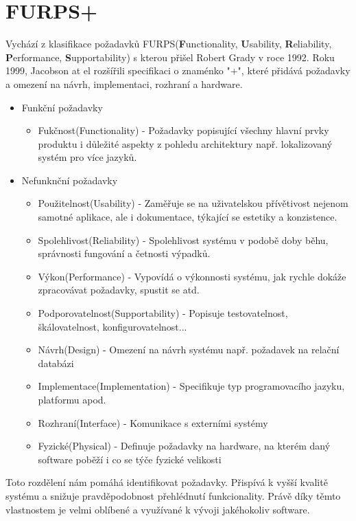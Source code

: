 \section{FURPS+}
	Vychází z klasifikace požadavků FURPS(\textbf{F}unctionality, \textbf{U}sability, \textbf{R}eliability, \textbf{P}erformance, \textbf{S}upportability) s kterou přišel Robert Grady v roce 1992. Roku 1999, Jacobson at el rozšířili specifikaci o znaménko "+", které přidává požadavky a omezení na návrh, implementaci, rozhraní a hardware\cite{furps}. 
	
	\begin{itemize}
		\item Funkční požadavky
			\begin{itemize}
				\item Fukčnost(Functionality) - Požadavky popisující všechny hlavní prvky produktu i důležité aspekty z pohledu architektury např. lokalizovaný systém pro více jazyků.
			\end{itemize}
		\item Nefunknční požadavky
			\begin{itemize}
				\item Použitelnost(Usability) - Zaměřuje se na uživatelskou přívětivost nejenom samotné aplikace, ale i dokumentace, týkající se estetiky a konzistence.
				\item Spolehlivost(Reliability) - Spolehlivost systému v podobě doby běhu, správnosti fungování a četnosti výpadků.
				\item Výkon(Performance) - Vypovídá o výkonnosti systému, jak rychle dokáže zpracovávat požadavky, spustit se atd.
				\item Podporovatelnost(Supportability) - Popisuje testovatelnost, škálovatelnost, konfigurovatelnost...
				\item Návrh(Design) - Omezení na návrh systému např. požadavek na relační databázi
				\item Implementace(Implementation) - Specifikuje typ programovacího jazyku, platformu apod.
				\item Rozhraní(Interface) - Komunikace s externími systémy
				\item Fyzické(Physical) - Definuje požadavky na hardware, na kterém daný software poběží i co se týče fyzické velikosti
			\end{itemize}
	\end{itemize}
	
	Toto rozdělení nám pomáhá identifikovat požadavky. Přispívá k vyšší kvalitě systému a snižuje pravděpodobnost přehlédnutí funkcionality. Právě díky těmto vlastnostem je velmi oblíbené a využívané k vývoji jakéhokoliv software. 